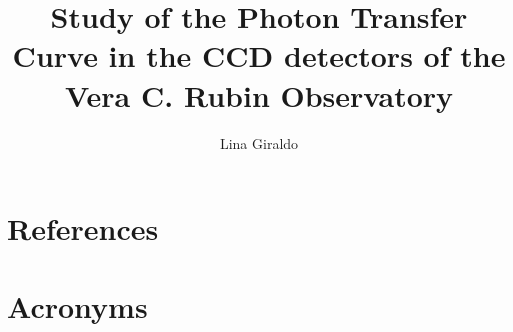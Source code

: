 \documentclass[OPS,authoryear,toc]{lsstdoc}
\title{Study of the Photon Transfer Curve in the CCD detectors of the Vera C. Rubin Observatory}
\author{%
Lina Giraldo
}
\date{\vcsDate}
\begin{document}
\maketitle


\appendix
\section{References} \label{sec:bib}
\renewcommand{\refname}{} %


\section{Acronyms} \label{sec:acronyms}

\end{document}

